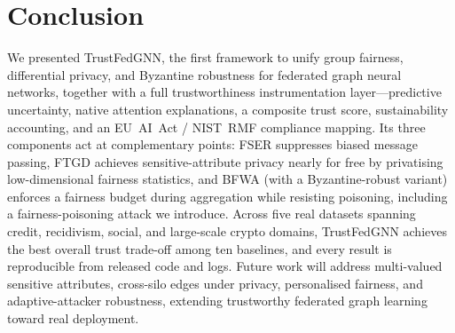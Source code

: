 \section{Conclusion}
\label{sec:conclusion}

We presented TrustFedGNN, the first framework to unify group fairness,
differential privacy, and Byzantine robustness for federated graph neural
networks, together with a full trustworthiness instrumentation layer---predictive
uncertainty, native attention explanations, a composite trust score,
sustainability accounting, and an EU~AI~Act / NIST~RMF compliance mapping. Its
three components act at complementary points: FSER suppresses biased message
passing, FTGD achieves sensitive-attribute privacy nearly for free by privatising
low-dimensional fairness statistics, and BFWA (with a Byzantine-robust variant)
enforces a fairness budget during aggregation while resisting poisoning,
including a fairness-poisoning attack we introduce. Across five real datasets
spanning credit, recidivism, social, and large-scale crypto domains, TrustFedGNN
achieves the best overall trust trade-off among ten baselines, and every result
is reproducible from released code and logs. Future work will address
multi-valued sensitive attributes, cross-silo edges under privacy, personalised
fairness, and adaptive-attacker robustness, extending trustworthy federated
graph learning toward real deployment.
